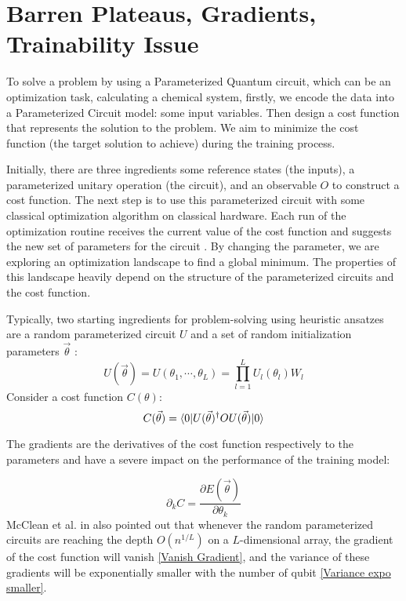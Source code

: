 \section{Barren Plateaus, Gradients, Trainability Issue}

To solve a problem by using a Parameterized Quantum circuit, which can be an optimization task, calculating a chemical system, firstly, we encode the data into a Parameterized Circuit model: some input variables. 
Then design a cost function that represents the solution to the problem. We aim to minimize the cost function (the target solution to achieve) during the training process.

Initially, there are three ingredients some reference states (the inputs), a parameterized unitary operation (the circuit), and an observable $O$ to construct a cost function.
The next step is to use this parameterized circuit with some classical optimization algorithm on classical hardware.
Each run of the optimization routine receives the current value of the cost function and suggests the new set of parameters for the circuit \cite{cerezo2021variational}.
By changing the parameter, we are exploring an optimization landscape to find a global minimum.
The properties of this landscape heavily depend on the structure of the parameterized circuits and the cost function.

Typically, two starting ingredients for problem-solving using heuristic ansatzes are a random parameterized circuit $U$ and a set of random initialization parameters $\vec{\theta}$ \cite{mccleanBarrenPlateausQuantum2018}:
\begin{equation}\label{Parameterized Circuit}
    U(\vec{\theta})
    = U(\theta_1, \cdots, \theta_L)
    = \prod_{l=1}^L U_l(\theta_l)W_l
\end{equation}
Consider a cost function $C(\theta)$:
\begin{equation}\label{Cost function}
    C(\vec{\theta})
    = \bra{0} U(\vec{\theta})^\dagger OU(\vec{\theta}) \ket{0}
\end{equation}

The gradients are the derivatives of the cost function respectively to the parameters and have a severe impact on the performance of the training model:

\begin{equation}
    \partial_k C = \frac{\partial E(\vec{\theta})}{\partial\theta_k}
\end{equation}
McClean et al. in \cite{mccleanBarrenPlateausQuantum2018} also pointed out that whenever the random parameterized circuits are reaching the depth $O(n^{1/L})$ on a $L$-dimensional array, the gradient of the cost function will vanish \ref{Vanish Gradient}, and the variance of these gradients will be exponentially smaller with the number of qubit \ref{Variance expo smaller}. 

